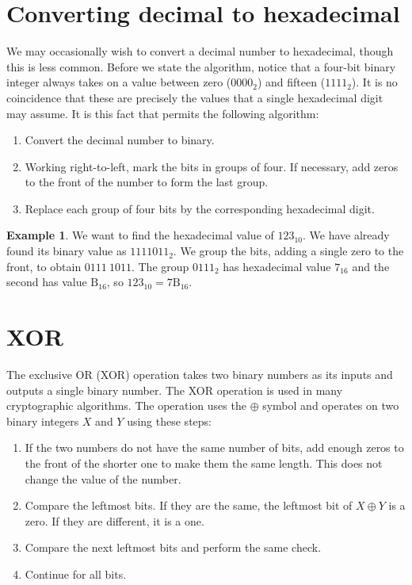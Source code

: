 \documentclass{book}
\theoremstyle{plain}
\theoremstyle{definition}
\newtheorem{example}[theorem]{Example}
\begin{document}
\section{Converting decimal to hexadecimal}
We may occasionally wish to convert a decimal number to hexadecimal, though this is less common. Before we state the algorithm, notice that a four-bit binary integer always takes on a value between zero ($0000_2$) and fifteen ($1111_2$). It is no coincidence that these are precisely the values that a single hexadecimal digit may assume. It is this fact that permits the following algorithm:
\begin{enumerate}
\item Convert the decimal number to binary.
\item Working right-to-left, mark the bits in groups of four. If necessary, add zeros to the front of the number to form the last group.
\item Replace each group of four bits by the corresponding hexadecimal digit.
\end{enumerate}

\begin{example}
We want to find the hexadecimal value of $123_{10}$. We have already found its binary value as $1111011_2$. We group the bits, adding a single zero to the front, to obtain $0111\ 1011$. The group $0111_2$ has hexadecimal value $7_{16}$ and the second has value $\text{B}_{16}$, so $123_{10} = 7\text{B}_{16}$.
\end{example}

\section{XOR}
The exclusive OR (XOR) operation takes two binary numbers as its inputs and outputs a single binary number. The XOR operation is used in many cryptographic algorithms. The operation uses the $\oplus$ symbol and operates on two binary integers $X$ and $Y$ using these steps:
\begin{enumerate}
\item If the two numbers do not have the same number of bits, add enough zeros to the front of the shorter one to make them the same length. This does not change the value of the number.
\item Compare the leftmost bits. If they are the same, the leftmost bit of $X \oplus Y$ is a zero. If they are different, it is a one.
\item Compare the next leftmost bits and perform the same check.
\item Continue for all bits.
\end{enumerate}
\end{document}
